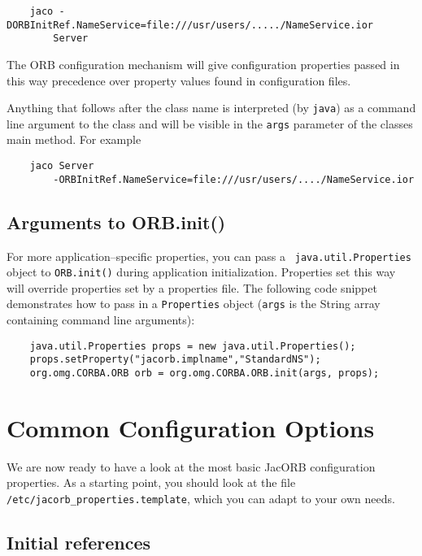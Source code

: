 \small{
\begin{verbatim}
    jaco -DORBInitRef.NameService=file:///usr/users/...../NameService.ior
        Server
\end{verbatim}

The ORB configuration mechanism will give configuration properties
passed in this way precedence over property values found in
configuration files.

Anything that follows after the class name is interpreted (by {\tt java}) as a
command line argument to the class and will be visible in the {\tt args}
parameter of the classes main method. For example

\small{
\begin{verbatim}
    jaco Server
        -ORBInitRef.NameService=file:///usr/users/..../NameService.ior
\end{verbatim}

\subsection{Arguments to ORB.init()}

For more application--specific properties, you can pass a {\tt
 java.util.Properties} object to {\tt ORB.init()} during application
initialization. Properties set this way will override properties set
by a properties file. The following code snippet demonstrates how to
pass in a {\tt Properties} object ({\tt args} is the String array
containing command line arguments):

\small{
\begin{verbatim}
    java.util.Properties props = new java.util.Properties();
    props.setProperty("jacorb.implname","StandardNS");
    org.omg.CORBA.ORB orb = org.omg.CORBA.ORB.init(args, props);
\end{verbatim}
}

\section{Common Configuration Options}

We are now ready to have a look at the most basic JacORB configuration
properties. As a starting point, you should look at the file {\tt
  /etc/jacorb\_properties.template}, which you can adapt to your own
needs.

\subsection{Initial references}

}}

